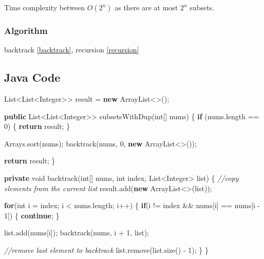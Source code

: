 \documentclass[]{book}
\newenvironment{Shaded}{\begin{snugshade}}{\end{snugshade}}
\newcommand{\BuiltInTok}[1]{#1}
\newcommand{\CommentTok}[1]{\textcolor[rgb]{0.56,0.35,0.01}{\textit{#1}}}
\newcommand{\DataTypeTok}[1]{\textcolor[rgb]{0.13,0.29,0.53}{#1}}
\newcommand{\DecValTok}[1]{\textcolor[rgb]{0.00,0.00,0.81}{#1}}
\newcommand{\FunctionTok}[1]{\textcolor[rgb]{0.00,0.00,0.00}{#1}}
\newcommand{\KeywordTok}[1]{\textcolor[rgb]{0.13,0.29,0.53}{\textbf{#1}}}
\newcommand{\NormalTok}[1]{#1}
\begin{document}
Time complexity between \(O(2^{n})\) as there are at most \(2^n\) subsets.

\hypertarget{algorithm-18}{%
\subsubsection{Algorithm}\label{algorithm-18}}

backtrack \ref{backtrack}, recursion \ref{recursion}

\hypertarget{java-code-14}{%
\subsection{Java Code}\label{java-code-14}}

\begin{Shaded}
\begin{Highlighting}[]
\BuiltInTok{List}\NormalTok{<}\BuiltInTok{List}\NormalTok{<}\BuiltInTok{Integer}\NormalTok{>> result = }\KeywordTok{new} \BuiltInTok{ArrayList}\NormalTok{<>();}

\KeywordTok{public} \BuiltInTok{List}\NormalTok{<}\BuiltInTok{List}\NormalTok{<}\BuiltInTok{Integer}\NormalTok{>> }\FunctionTok{subsetsWithDup}\NormalTok{(}\DataTypeTok{int}\NormalTok{[] nums) \{}
    \KeywordTok{if}\NormalTok{ (nums.}\FunctionTok{length}\NormalTok{ == }\DecValTok{0}\NormalTok{) \{}
        \KeywordTok{return}\NormalTok{ result;}
\NormalTok{    \}}

    \BuiltInTok{Arrays}\NormalTok{.}\FunctionTok{sort}\NormalTok{(nums);}
    \FunctionTok{backtrack}\NormalTok{(nums, }\DecValTok{0}\NormalTok{, }\KeywordTok{new} \BuiltInTok{ArrayList}\NormalTok{<>());}

    \KeywordTok{return}\NormalTok{ result;}
\NormalTok{\}}

\KeywordTok{private} \DataTypeTok{void} \FunctionTok{backtrack}\NormalTok{(}\DataTypeTok{int}\NormalTok{[] nums, }\DataTypeTok{int}\NormalTok{ index, }\BuiltInTok{List}\NormalTok{<}\BuiltInTok{Integer}\NormalTok{> list) \{}
    \CommentTok{//copy elements from the current list}
\NormalTok{    result.}\FunctionTok{add}\NormalTok{(}\KeywordTok{new} \BuiltInTok{ArrayList}\NormalTok{<>(list));}

    \KeywordTok{for}\NormalTok{(}\DataTypeTok{int}\NormalTok{ i = index; i < nums.}\FunctionTok{length}\NormalTok{; i++) \{}
        \KeywordTok{if}\NormalTok{(i != index && nums[i] == nums[i - }\DecValTok{1}\NormalTok{]) \{}
            \KeywordTok{continue}\NormalTok{;}
\NormalTok{        \}}

\NormalTok{        list.}\FunctionTok{add}\NormalTok{(nums[i]);}
        \FunctionTok{backtrack}\NormalTok{(nums, i + }\DecValTok{1}\NormalTok{, list);}

        \CommentTok{//remove last element to backtrack}
\NormalTok{        list.}\FunctionTok{remove}\NormalTok{(list.}\FunctionTok{size}\NormalTok{() - }\DecValTok{1}\NormalTok{);}
\NormalTok{    \}}
\NormalTok{\}}
\end{Highlighting}
\end{Shaded}
\end{document}
